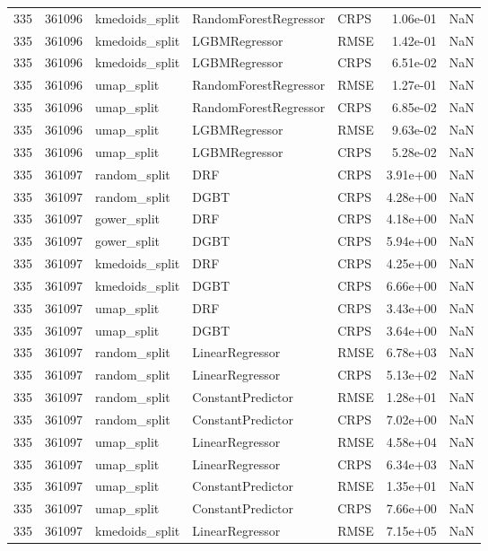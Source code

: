\begin{tabular}{rrlllrr}
335 & 361096 & kmedoids\_split & RandomForestRegressor & CRPS & 1.06e-01 & NaN \\
335 & 361096 & kmedoids\_split & LGBMRegressor & RMSE & 1.42e-01 & NaN \\
335 & 361096 & kmedoids\_split & LGBMRegressor & CRPS & 6.51e-02 & NaN \\
335 & 361096 & umap\_split & RandomForestRegressor & RMSE & 1.27e-01 & NaN \\
335 & 361096 & umap\_split & RandomForestRegressor & CRPS & 6.85e-02 & NaN \\
335 & 361096 & umap\_split & LGBMRegressor & RMSE & 9.63e-02 & NaN \\
335 & 361096 & umap\_split & LGBMRegressor & CRPS & 5.28e-02 & NaN \\
335 & 361097 & random\_split & DRF & CRPS & 3.91e+00 & NaN \\
335 & 361097 & random\_split & DGBT & CRPS & 4.28e+00 & NaN \\
335 & 361097 & gower\_split & DRF & CRPS & 4.18e+00 & NaN \\
335 & 361097 & gower\_split & DGBT & CRPS & 5.94e+00 & NaN \\
335 & 361097 & kmedoids\_split & DRF & CRPS & 4.25e+00 & NaN \\
335 & 361097 & kmedoids\_split & DGBT & CRPS & 6.66e+00 & NaN \\
335 & 361097 & umap\_split & DRF & CRPS & 3.43e+00 & NaN \\
335 & 361097 & umap\_split & DGBT & CRPS & 3.64e+00 & NaN \\
335 & 361097 & random\_split & LinearRegressor & RMSE & 6.78e+03 & NaN \\
335 & 361097 & random\_split & LinearRegressor & CRPS & 5.13e+02 & NaN \\
335 & 361097 & random\_split & ConstantPredictor & RMSE & 1.28e+01 & NaN \\
335 & 361097 & random\_split & ConstantPredictor & CRPS & 7.02e+00 & NaN \\
335 & 361097 & umap\_split & LinearRegressor & RMSE & 4.58e+04 & NaN \\
335 & 361097 & umap\_split & LinearRegressor & CRPS & 6.34e+03 & NaN \\
335 & 361097 & umap\_split & ConstantPredictor & RMSE & 1.35e+01 & NaN \\
335 & 361097 & umap\_split & ConstantPredictor & CRPS & 7.66e+00 & NaN \\
335 & 361097 & kmedoids\_split & LinearRegressor & RMSE & 7.15e+05 & NaN \\

\end{tabular}
